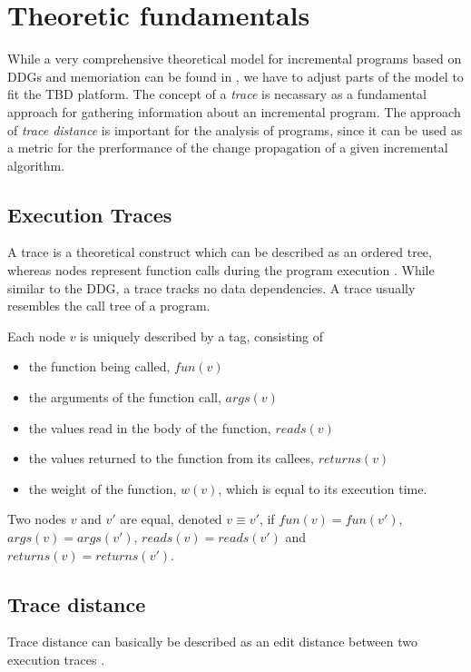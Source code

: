 \section{Theoretic fundamentals}
While a very comprehensive theoretical model for incremental programs based on DDGs and memoriation can be found in \cite{Acar2005thesis}, we have to adjust parts of the model to fit the TBD platform. The concept of a \textit{trace} is necassary as a fundamental approach for gathering information about an incremental program. The approach of \textit{trace distance} is important for the analysis of programs, since it can be used as a metric for the prerformance of the change propagation of a given incremental algorithm. 

\subsection{Execution Traces}

\label{sec:ddg_memo}
A trace is a theoretical construct which can be described as an ordered tree, whereas nodes represent function calls during the program execution \cite{Acar2005thesis}. While similar to the DDG, a trace tracks no data dependencies. A trace usually resembles the call tree of a program. 

\begin{definition}
Each node $v$ is uniquely described by a tag, consisting of

\begin{itemize}
\item the function being called, $fun(v)$
\item the arguments of the function call, $args(v)$
\item the values read in the body of the function, $reads(v)$
\item the values returned to the function from its callees, $returns(v)$
\item the weight of the function, $w(v)$, which is equal to its execution time.
\end{itemize}

Two nodes $v$ and $v'$ are equal, denoted $v \equiv v'$, if $fun(v) = fun(v')$, $args(v) = args(v')$, $reads(v) = reads(v')$ and $returns(v) = returns(v')$.
\end{definition}

\subsection{Trace distance}
Trace distance can basically be described as an edit distance between two execution traces \cite{Acar2005thesis} \cite{acar2004dynamizing}. 

